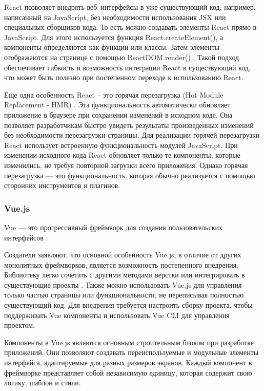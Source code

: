 React позволяет внедрять веб--интерфейсы в уже существующий код, например, написанный на JavaScript, без необходимости использования JSX или специальных сборщиков кода. 
То есть можно создавать элементы React прямо в JavaScript.
Для этого используется функция React.createElement(), а компоненты определяются как функции или классы. 
Затем элементы отображаются на странице с помощью ReactDOM.render() \cite{react-doc}.
Такой подход обеспечивает гибкость и возможность интеграции React в существующий код, что может быть полезно при постепенном переходе к использованию React.

Еще одна особенность React – это горячая перезагрузка (Hot Module Replacement - HMR) \cite{hmr}. 
Эта функциональность автоматически обновляет приложение в браузере при сохранении изменений в исходном коде. 
Она позволяет разработчикам быстро увидеть результаты произведенных изменений без необходимости перезагрузки страницы.
Для реализации горячей перезагрузки React использует встроенную функциональность модулей JavaScript. 
При изменении исходного кода React обновляет только те компоненты, которые изменились, не требуя повторной загрузки всего приложения.
Однако горячая перезагрузка --- это функциональность, которая обычно реализуется с помощью сторонних инструментов и плагинов.


\subsubsection{Vue.js}

Vue --- это прогрессивный фреймворк для создания пользовательских интерфейсов \cite{vue}. 

Создатели заявляют, что основной особенность Vue.js, в отличие от других монолитных фреймворков, является возможность постепенного внедрения. 
Библиотеку легко сочетать с другими методами верстки или интегрировать в существующие проекты \cite{vue}.
Также можно использовать Vue.js для управления только частью страницы или функциональности, не переписывая полностью существующий код.
Для внедрения требуется настроить сборку проекта, чтобы поддерживать Vue компоненты и использовать Vue CLI \cite{vue-cli} для управления проектом.

Компоненты в Vue.js являются основным строительным блоком при разработке приложений. 
Они позволяют создавать переиспользуемые и модульные элементы интерфейса, адаптируемые для разных размеров экранов.
Каждый компонент в фреймворке представляет собой независимую единицу, которая содержит свою логику, шаблон и стили.


